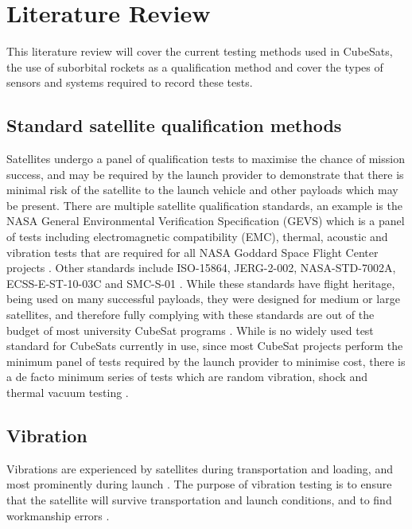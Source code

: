 \documentclass[a4paper,11pt]{article}
\begin{document}
\section{Literature Review}

This literature review will cover the current testing methods used in CubeSats, the use of suborbital rockets as a qualification method and cover the types of sensors and systems required to record these tests.

\subsection{Standard satellite qualification methods}
Satellites undergo a panel of qualification tests to maximise the chance of mission success, and may be required by the launch provider to demonstrate that there is minimal risk of the satellite to the launch vehicle and other payloads which may be present. There are multiple satellite qualification standards, an example is the NASA General Environmental Verification Specification (GEVS) which is a panel of tests including electromagnetic compatibility (EMC), thermal, acoustic and vibration tests that are required for all NASA Goddard Space Flight Center projects \cite{nasa-gevs}. Other standards include ISO-15864, JERG-2-002, NASA-STD-7002A, ECSS-E-ST-10-03C and SMC-S-01 \cite{cho2012overview}. While these standards have flight heritage, being used on many successful payloads, they were designed for medium or large satellites, and therefore fully complying with these standards are out of the budget of most university CubeSat programs \cite{cho2012overview}. While is no widely used test standard for CubeSats currently in use, since most CubeSat projects perform the minimum panel of tests required by the launch provider to minimise cost, there is a de facto minimum series of tests which are random vibration, shock and thermal vacuum testing \cite{welle2020overview}.


\subsection{Vibration}
Vibrations are experienced by satellites during transportation and loading, and most prominently during launch \cite{brown_elements_2002}. The purpose of vibration testing is to ensure that the satellite will survive transportation and launch conditions, and to find workmanship errors \cite{brown_elements_2002,gordon2015benefits}.
\end{document}
